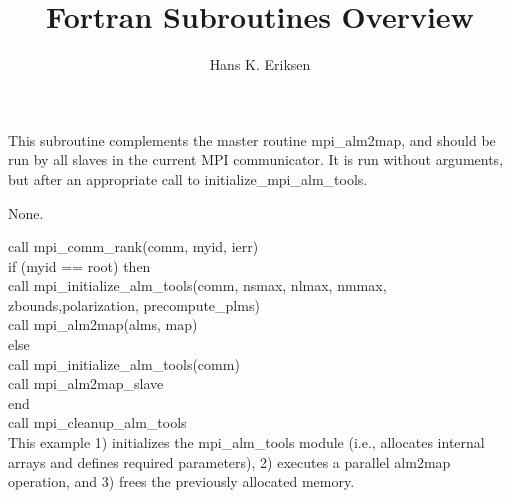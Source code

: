
\sloppy


\title{\healpix Fortran Subroutines Overview}
 \section[mpi\_alm2map\_slave]{ }
\label{sub:mpi_alm2map_slave}
\author{Hans K. Eriksen}

\begin{facility}
{This subroutine complements the master routine mpi\_alm2map, and
should be run by all slaves in the current MPI communicator. It is run
without arguments, but after an appropriate call to
initialize\_mpi\_alm\_tools. 
}
{\modMpiAlmTools}
\end{facility}

\begin{f90format}
{}
\end{f90format}

\begin{arguments}
{
None.
}
\end{arguments}

\begin{example}
{
call mpi\_comm\_rank(comm, myid, ierr)\\
if (myid == root) then\\
\hspace*{1cm}call mpi\_initialize\_alm\_tools(comm, nsmax, nlmax, nmmax, \\
\hspace*{3cm}zbounds,polarization, precompute\_plms)\\
\hspace*{1cm}call mpi\_alm2map(alms, map)\\
else \\
\hspace*{1cm}call mpi\_initialize\_alm\_tools(comm)\\
\hspace*{1cm}call mpi\_alm2map\_slave\\
end\\
call mpi\_cleanup\_alm\_tools\\
}
{
This example 1) initializes the mpi\_alm\_tools module (i.e.,
allocates internal arrays and defines required parameters), 2)
executes a parallel alm2map operation, and 3) frees the previously
allocated memory.
}
\end{example}

